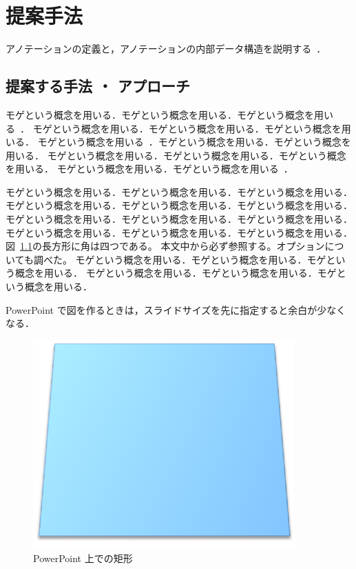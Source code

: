 \chapter{提案手法}
\label{ch:app}
\quad

アノテーションの定義と，アノテーションの内部データ構造を説明する~\cite{flanagan2008ruby}．

\section{提案する手法 ・ アプローチ}
\label{sec:app_xx}

モゲという概念を用いる．モゲという概念を用いる．モゲという概念を用いる~\cite{goto2010bioruby}．
モゲという概念を用いる．モゲという概念を用いる．モゲという概念を用いる．
モゲという概念を用いる~\cite{matsumoto2002ruby}．モゲという概念を用いる．モゲという概念を用いる．
モゲという概念を用いる．モゲという概念を用いる．モゲという概念を用いる．
モゲという概念を用いる．モゲという概念を用いる~\cite{fulton2006ruby}．

モゲという概念を用いる．モゲという概念を用いる．モゲという概念を用いる．
モゲという概念を用いる．モゲという概念を用いる．モゲという概念を用いる．
モゲという概念を用いる．モゲという概念を用いる．モゲという概念を用いる．
モゲという概念を用いる．モゲという概念を用いる．モゲという概念を用いる．
図~\ref{fig:rectangle}の長方形に角は四つである。
本文中から必ず参照する。オプションについても調べた。
モゲという概念を用いる．モゲという概念を用いる．モゲという概念を用いる．
モゲという概念を用いる．モゲという概念を用いる．モゲという概念を用いる．

PowerPoint で図を作るときは，スライドサイズを先に指定すると余白が少なくなる．

\begin{figure}[htbp]
\centering
\includegraphics[width=10cm]{img/sample.pdf}
\caption{PowerPoint 上での矩形}
\label{fig:rectangle}
\end{figure}%

